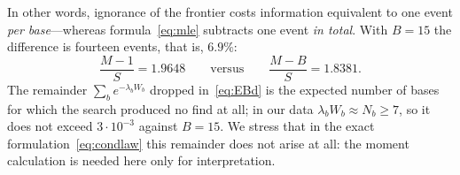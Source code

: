 \documentclass[11pt,a4paper]{article}
\theoremstyle{plain}
\theoremstyle{remark}
\begin{document}
In other words, ignorance of the frontier costs information equivalent to one
event \emph{per base}---whereas formula~\eqref{eq:mle} subtracts one event
\emph{in total}. With $B=15$ the difference is fourteen events, that is, $6.9\%$:
\begin{equation}\label{eq:cost}
\frac{M-1}{S}=1.9648\qquad\text{versus}\qquad\frac{M-B}{S}=1.8381 .
\end{equation}
The remainder $\sum_b e^{-\lambda_b W_b}$ dropped in~\eqref{eq:EBd} is the
expected number of bases for which the search produced no find at all; in our
data $\lambda_bW_b\approx N_b\ge7$, so it does not exceed $3\cdot10^{-3}$
against $B=15$. We stress that in the exact formulation~\eqref{eq:condlaw} this
remainder does not arise at all: the moment calculation is needed here only for
interpretation.
\end{document}
